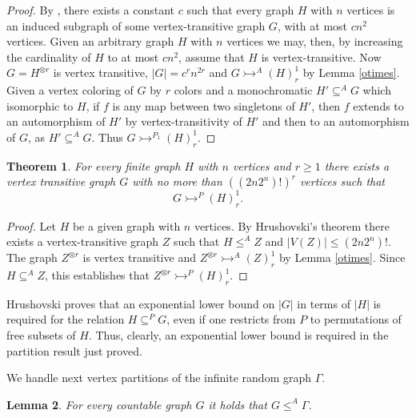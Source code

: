 \documentclass[11pt]{amsart}
\newcommand{\ars}{\rightarrowtail}
\newcommand{\su}{\subseteq}
\newtheorem{theorem}{Theorem}[section]
\newtheorem{lemma}[theorem]{Lemma}
\begin{document}
\begin{proof}
  By \cite{BS}, there exists a constant $c$ such that every graph $H$
  with $n$ vertices is an induced subgraph of some vertex-transitive
 graph $G$, with at most $cn^2$ vertices. Given an
  arbitrary graph $H$ with $n$ vertices we may, then,  by increasing
the
  cardinality of $H$ to at most $cn^2$,  assume that $H$
  is vertex-transitive. Now $G=H^{\otimes r}$ is vertex transitive,
  $|G|=c^r n^{2r}$ and $G\ars^A(H)^1_r$ by Lemma \ref{otimes}. Given a
  vertex coloring of $G$ by $r$ colors and a monochromatic $H'\su ^A
  G$ which isomorphic to $H$, if  $f$ is any map between two
  singletons of $H'$, then $f$ extends to an automorphism of $H'$ by
  vertex-transitivity of $H'$ and then to an automorphism of $G$, as
  $H'\su ^A G$. Thus  $G\ars^{P_1}(H)^1_r$.
\end{proof}

\begin{theorem} \label{P} For every finite graph $H$ with $n$ vertices
  and $r\ge1$ there exists a vertex transitive graph $G$ with no more
  than $((2n2^n)!)^r$ vertices such that
\[G\ars^P(H)^1_r.\]
\end{theorem}

\begin{proof}
  Let $H$ be a given graph with $n$ vertices. By Hrushovski's theorem
  there exists a vertex-transitive graph $Z$ such that $H\le^A Z$ and
  $|V(Z)|\le (2n2^n)!$. The graph $Z^{\otimes r}$ is vertex transitive
  and $Z^{\otimes r}\ars^A(Z)^1_r$ by Lemma \ref{otimes}. Since
  $H\su^A Z$, this establishes that $Z^{\otimes r}\ars^P(H)^1_r$.
\end{proof}

Hrushovski \cite{H} proves that an exponential lower bound on $|G|$ in
terms of $|H|$ is required
 for the relation  $H\su^PG$, even if one restricts from  $P$ to
 permutations of free subsets of $H$. Thus, clearly, an exponential
 lower bound is required in the partition result just proved.

We handle next vertex partitions of the infinite random graph
$\Gamma$.

\begin{lemma}\label{inGamma}
For every countable graph $G$ it holds that $G\le ^A \Gamma$.
 \end{lemma}
\end{document}
